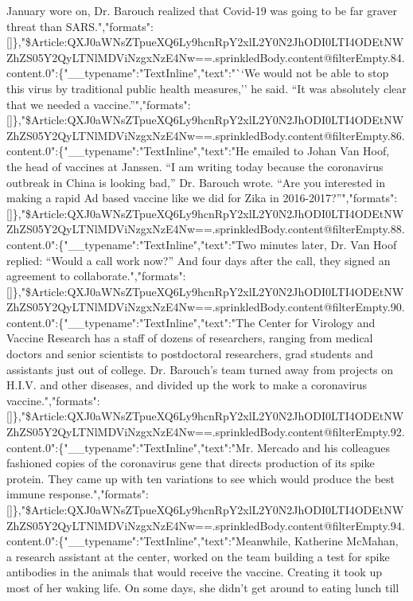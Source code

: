January wore on, Dr. Barouch realized that Covid-19 was going to be far
graver threat than
SARS.","formats":{[}{]}\},"\$Article:QXJ0aWNsZTpueXQ6Ly9hcnRpY2xlL2Y0N2JhODI0LTI4ODEtNWZhZS05Y2QyLTNlMDViNzgxNzE4Nw==.sprinkledBody.content@filterEmpty.84.content.0":\{"\_\_typename":"TextInline","text":"``We
would not be able to stop this virus by traditional public health
measures,'' he said. ``It was absolutely clear that we needed a
vaccine.''","formats":{[}{]}\},"\$Article:QXJ0aWNsZTpueXQ6Ly9hcnRpY2xlL2Y0N2JhODI0LTI4ODEtNWZhZS05Y2QyLTNlMDViNzgxNzE4Nw==.sprinkledBody.content@filterEmpty.86.content.0":\{"\_\_typename":"TextInline","text":"He
emailed to Johan Van Hoof, the head of vaccines at Janssen. ``I am
writing today because the coronavirus outbreak in China is looking
bad,'' Dr. Barouch wrote. ``Are you interested in making a rapid Ad
based vaccine like we did for Zika in
2016-2017?''","formats":{[}{]}\},"\$Article:QXJ0aWNsZTpueXQ6Ly9hcnRpY2xlL2Y0N2JhODI0LTI4ODEtNWZhZS05Y2QyLTNlMDViNzgxNzE4Nw==.sprinkledBody.content@filterEmpty.88.content.0":\{"\_\_typename":"TextInline","text":"Two
minutes later, Dr. Van Hoof replied: ``Would a call work now?'' And four
days after the call, they signed an agreement to
collaborate.","formats":{[}{]}\},"\$Article:QXJ0aWNsZTpueXQ6Ly9hcnRpY2xlL2Y0N2JhODI0LTI4ODEtNWZhZS05Y2QyLTNlMDViNzgxNzE4Nw==.sprinkledBody.content@filterEmpty.90.content.0":\{"\_\_typename":"TextInline","text":"The
Center for Virology and Vaccine Research has a staff of dozens of
researchers, ranging from medical doctors and senior scientists to
postdoctoral researchers, grad students and assistants just out of
college. Dr. Barouch's team turned away from projects on H.I.V. and
other diseases, and divided up the work to make a coronavirus
vaccine.","formats":{[}{]}\},"\$Article:QXJ0aWNsZTpueXQ6Ly9hcnRpY2xlL2Y0N2JhODI0LTI4ODEtNWZhZS05Y2QyLTNlMDViNzgxNzE4Nw==.sprinkledBody.content@filterEmpty.92.content.0":\{"\_\_typename":"TextInline","text":"Mr.
Mercado and his colleagues fashioned copies of the coronavirus gene that
directs production of its spike protein. They came up with ten
variations to see which would produce the best immune
response.","formats":{[}{]}\},"\$Article:QXJ0aWNsZTpueXQ6Ly9hcnRpY2xlL2Y0N2JhODI0LTI4ODEtNWZhZS05Y2QyLTNlMDViNzgxNzE4Nw==.sprinkledBody.content@filterEmpty.94.content.0":\{"\_\_typename":"TextInline","text":"Meanwhile,
Katherine McMahan, a research assistant at the center, worked on the
team building a test for spike antibodies in the animals that would
receive the vaccine. Creating it took up most of her waking life. On
some days, she didn't get around to eating lunch till
